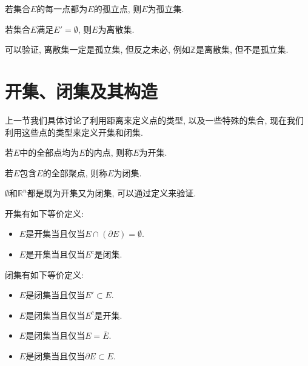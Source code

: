 \documentclass[theorem=false,mathfont=none,openany,sub3section]{easybook}
\begin{document}
\begin{definition}
  若集合$E$的每一点都为$E$的孤立点, 则$E$为孤立集.\par
  若集合$E$满足$E'=\emptyset$, 则$E$为离散集.\par
\end{definition}

\begin{remark}
  可以验证, 离散集一定是孤立集, 但反之未必, 例如$\mathbb{Z}$是离散集, 但不是孤立集.\par
\end{remark}

\newpage

\section{开集、闭集及其构造}

上一节我们具体讨论了利用距离来定义点的类型, 以及一些特殊的集合, 现在我们利用这些点的类型来定义开集和闭集.\par

\begin{definition}
  若$E$中的全部点均为$E$的内点, 则称$E$为开集.\par
  若$E$包含$E$的全部聚点, 则称$E$为闭集.\par
\end{definition}

\begin{remark}
  $\emptyset$和$\mathbb{R}^n$都是既为开集又为闭集, 可以通过定义来验证.\par
\end{remark}

\begin{theorem}
  开集有如下等价定义:\par
  \begin{itemize}
    \item $E$是开集当且仅当$E\cap (\partial E)=\emptyset$.
    \item $E$是开集当且仅当$E^c$是闭集.
  \end{itemize}
\end{theorem}

\begin{theorem}
  闭集有如下等价定义:\par
  \begin{itemize}
    \item $E$是闭集当且仅当$E'\subset E$.
    \item $E$是闭集当且仅当$E^c$是开集.
    \item $E$是闭集当且仅当$E=\overline{E}$.
    \item $E$是闭集当且仅当$\partial E\subset E$.
  \end{itemize}
\end{theorem}
\end{document}
